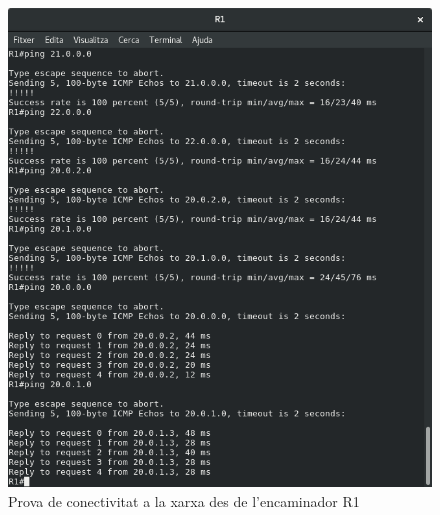 \documentclass[10pt]{article}
\begin{document}
\begin{figure}[H]
\begin{center}
\includegraphics[scale=0.4]{Images/ospf-R1-conectivity.png}
\caption{Prova de conectivitat a la xarxa des de l'encaminador R1}
\end{center}
\end{figure}
\end{document}
